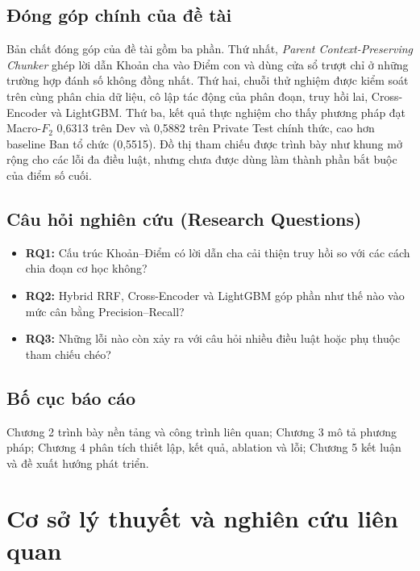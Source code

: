 \documentclass[12pt,a4paper]{article}
\begin{document}
\subsection{Đóng góp chính của đề tài}
Bản chất đóng góp của đề tài gồm ba phần. Thứ nhất, \textit{Parent Context-Preserving Chunker} ghép lời dẫn Khoản cha vào Điểm con và dùng cửa sổ trượt chỉ ở những trường hợp đánh số không đồng nhất. Thứ hai, chuỗi thử nghiệm được kiểm soát trên cùng phân chia dữ liệu, cô lập tác động của phân đoạn, truy hồi lai, Cross-Encoder và LightGBM. Thứ ba, kết quả thực nghiệm cho thấy phương pháp đạt Macro-$F_2$ 0,6313 trên Dev và 0,5882 trên Private Test chính thức, cao hơn baseline Ban tổ chức (0,5515). Đồ thị tham chiếu được trình bày như khung mở rộng cho các lỗi đa điều luật, nhưng chưa được dùng làm thành phần bắt buộc của điểm số cuối.

\subsection{Câu hỏi nghiên cứu (Research Questions)}
\begin{itemize}[leftmargin=0.6cm]
    \item \textbf{RQ1:} Cấu trúc Khoản--Điểm có lời dẫn cha cải thiện truy hồi so với các cách chia đoạn cơ học không?
    \item \textbf{RQ2:} Hybrid RRF, Cross-Encoder và LightGBM góp phần như thế nào vào mức cân bằng Precision--Recall?
    \item \textbf{RQ3:} Những lỗi nào còn xảy ra với câu hỏi nhiều điều luật hoặc phụ thuộc tham chiếu chéo?
\end{itemize}

\subsection{Bố cục báo cáo}
Chương 2 trình bày nền tảng và công trình liên quan; Chương 3 mô tả phương pháp; Chương 4 phân tích thiết lập, kết quả, ablation và lỗi; Chương 5 kết luận và đề xuất hướng phát triển.

\section{Cơ sở lý thuyết và nghiên cứu liên quan}
\end{document}
